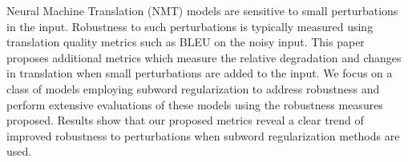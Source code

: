 Neural Machine Translation (NMT) models are sensitive to small perturbations in the input. Robustness to such perturbations is typically measured using translation quality metrics such as BLEU on the noisy input. This paper proposes additional metrics which measure the relative degradation and changes in translation when small perturbations are added to the input. We focus on a class of models employing subword regularization to address robustness and perform extensive evaluations of these models using the robustness measures proposed. Results show that our proposed metrics reveal a clear trend of improved robustness to perturbations when subword regularization methods are used.
